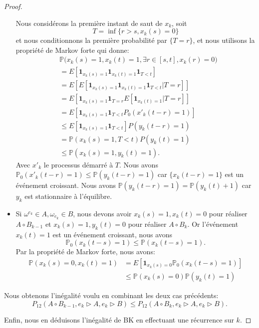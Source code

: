 \documentclass[titlepage,a4paper,12pt]{article}
\newcounter{prop}
\begin{document}
\begin{proof}
\begin{itemize}[label = $\bullet$, leftmargin = *]
Nous considérons la première instant de saut de $x_k$, soit 
$$T = \inf\{ r> s, x_k(s) =0 \}
$$
et nous conditionnons la première probabilité par $\{T=r\}$, et nous utilisons la propriété de Markov forte qui donne:
\begin{align*}
&\mathbb{P}\big(x_k(s) = 1, x_k(t) =1, \exists r\in [s,t], x_k(r) = 0\big) \\
&= E\left[\mathbf{1}_{x_k(s) = 1}\mathbf{1}_{x_k(t) = 1}\mathbf{1}_{T<t}\right] \\
&= E\left[E[\mathbf{1}_{x_k(s) = 1}\mathbf{1}_{x_k(t) = 1}\mathbf{1}_{T<t}| T=r]\right] \\
&= E\left[\mathbf{1}_{x_k(s) = 1}\mathbf{1}_{T = r}E[\mathbf{1}_{x_k(t) = 1}| T=r]\right] \\
& = E\left[\mathbf{1}_{x_k(s) = 1}\mathbf{1}_{T <t}P_0(x'_k(t-r) =1)\right] \\
& \leqslant E\left[\mathbf{1}_{x_k(s) = 1}\mathbf{1}_{T <t}\right]P(y_k(t-r) =1)\\
& = \mathbb{P}(x_k(s) = 1, T< t) P(y_k(t)=1) \\
& \leqslant \mathbb{P}(x_k(s)=1, y_k(t) = 1).
\end{align*}
Avec $x'_k$ le processus démarré à $T$. Nous avons $\mathbb{P}_0(x'_k(t-r) = 1) \leqslant \mathbb{P}(y_k(t-r) = 1)$ car $\{x_k(t-r) = 1\}$ est un événement croissant. Nous avons $\mathbb{P}(y_k(t-r)= 1) = \mathbb{P}(y_k(t)+1)$ car $y_k$ est stationnaire à l'équilibre.

\item Si $\omega^{e_k}\in A, \omega_{e_k}\in B$, nous devons avoir $x_k(s)=1,x_k(t)=0$ pour réaliser $A\circ B_{k-1}$ et $x_k(s) = 1, y_k(t) = 0$ pour réaliser $A\circ B_k$. Or l'événement $x_k(t) = 1$ est un événement croissant, nous avons $$\mathbb{P}_0(x_k(t-s) = 1)\leqslant\mathbb{P}(x_k(t-s) =1).$$ Par la propriété de Markov forte, nous avons:
\begin{align*}
\mathbb{P}(x_k(s) = 0, x_k(t) = 1) &= E[\mathbf{1}_{x_k(s)=0}\mathbb{P}_0(x_k(t-s) = 1)]\\
& \leqslant \mathbb{P}(x_k(s) = 0) \mathbb{P}(y_k(t) = 1)
\end{align*}
\end{itemize}


Nous obtenons l'inégalité voulu en combinant les deux cas précédents: $$P_{12}(A\circ B_{k-1}, e_k\triangleright A, e_k \triangleright B)\leqslant P_{12}(A\circ B_{k}, e_k\triangleright A, e_k \triangleright B).$$

Enfin, nous en déduisons l'inégalité de BK en effectuant une récurrence sur $k$. 
\end{proof}
\end{document}
